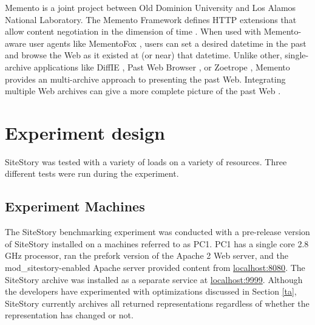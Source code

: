 \documentclass[runningheads,a4paper]{llncs}
\begin{document}


Memento is a joint project between Old Dominion University and Los Alamos National Laboratory.  The Memento Framework defines HTTP extensions that allow content negotiation in the dimension of time \cite{nelson:memento:tr, ldow2010:memento}.  When used with Memento-aware user agents like MementoFox \cite{sandersonimplementing}, users can set a desired datetime in the past and browse the Web as it existed at (or near) that datetime.  Unlike other, single-archive applications like DiffIE \cite{Teevan:2010:LSH:1753326.1753530, 1622221}, Past Web Browser \cite{jatowt2006journey}, or Zoetrope \cite{adar2008zoetrope}, Memento provides an multi-archive approach to presenting the past Web. Integrating multiple Web archives can give a more complete picture of the past Web \cite{hmotwia}.

\section{Experiment design}
\label{experiment}
\vskip -3mm

SiteStory was tested with a variety of loads on a variety of resources. Three different tests were run during the experiment.


\subsection{Experiment Machines}
\label{machines}
\vskip -3mm

The SiteStory benchmarking experiment was conducted with a pre-release
version of SiteStory installed on a machines referred to as PC1. PC1 has a single core 2.8 GHz processor, 
ran the prefork version of the Apache 2 Web server, and the mod\_sitestory-enabled Apache server provided content
from \url{localhost:8080}. The SiteStory archive was installed as a separate service at
\url{localhost:9999}.  Although the developers have experimented with optimizations
discussed in Section \ref{ta}, SiteStory currently archives all
returned representations regardless of whether the representation has
changed or not.
\end{document}
